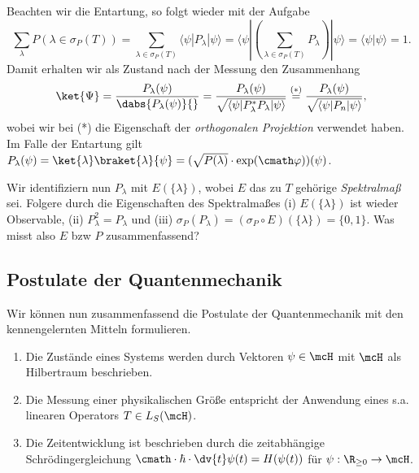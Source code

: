 \documentclass{subfiles}
\begin{document}
        Beachten wir die Entartung, so folgt wieder mit der Aufgabe
        \[
            \sum_{\lambda}P(\lambda\in\sigma_P(T)) = \sum_{\lambda\in\sigma_P(T)}\langle\psi|P_\lambda|\psi\rangle = \langle\psi|\left(\sum_{\lambda\in\sigma_P(T)}P_\lambda\right)|\psi\rangle = \langle\psi|\psi\rangle = 1.
        \]
        Damit erhalten wir als Zustand nach der Messung den Zusammenhang
        \[
            \ket{\Psi} = \frac{P_\lambda(\psi)}{\dabs{P_\lambda(\psi)}{}} = \frac{P_\lambda(\psi)}{\sqrt{\langle\psi|P_\lambda^*P_\lambda|\psi\rangle}} \stackrel{(*)}{=} \frac{P_\lambda(\psi)}{\sqrt{\langle\psi|P_n|\psi\rangle}},
        \]
        wobei wir bei (*) die Eigenschaft der \emph{orthogonalen Projektion} verwendet haben. Im Falle der Entartung gilt $P_\lambda(\psi) = \ket{\lambda}\braket{\lambda}{\psi} = (\sqrt{P(\lambda)}\cdot\exp(\cmath\varphi))(\psi)$. 

        \begin{Aufgabe}
            \nr{} Wir identifiziern nun $P_\lambda$ mit $E(\{\lambda\})$, wobei $E$ das zu $T$ gehörige \emph{Spektralmaß} sei. Folgere durch die Eigenschaften des Spektralmaßes (i) $E(\{\lambda\})$ ist wieder Observable, (ii) $P_\lambda^2 = P_\lambda$ und (iii) $\sigma_P(P_\lambda) = (\sigma_P\circ E)(\{\lambda\}) = \{0,1\}$. Was misst also $E$ bzw $P$ zusammenfassend?
        \end{Aufgabe}

    \subsection{Postulate der Quantenmechanik}
        Wir können nun zusammenfassend die Postulate der Quantenmechanik mit den kennengelernten Mitteln formulieren.
        \begin{enumerate}[label=(\roman*)]
            \item Die Zustände eines Systems werden durch Vektoren $\psi\in\mcH$ mit $\mcH$ als Hilbertraum beschrieben.
            \item Die Messung einer physikalischen Größe entspricht der Anwendung eines s.a. linearen Operators $T\in L_S(\mcH)$.
            \item Die Zeitentwicklung ist beschrieben durch die zeitabhängige Schrödingergleichung $\cmath\cdot\hbar\cdot \dv{t}\psi(t) = H(\psi(t))$ für $\psi:\R_{\geq 0}\to\mcH$. 
        \end{enumerate}
\end{document}

